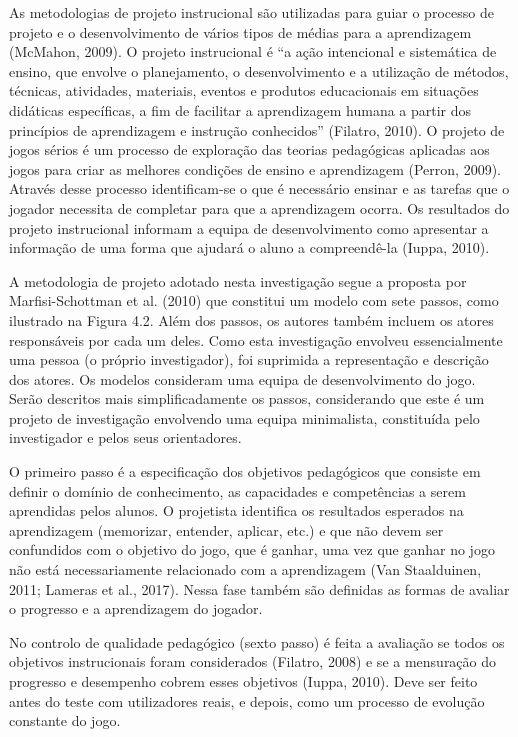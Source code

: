 As metodologias de projeto instrucional são utilizadas para guiar o processo de projeto e o desenvolvimento de vários tipos de médias para a aprendizagem (McMahon, 2009). O projeto instrucional é ``a ação intencional e sistemática de ensino, que envolve o planejamento, o desenvolvimento e a utilização de métodos, técnicas, atividades, materiais, eventos e produtos educacionais em situações didáticas específicas, a fim de facilitar a aprendizagem humana a partir dos princípios de aprendizagem e instrução conhecidos'' (Filatro, 2010). O projeto de jogos sérios é um processo de exploração das teorias pedagógicas aplicadas aos jogos para criar as melhores condições de ensino e aprendizagem (Perron, 2009). Através desse processo identificam-se o que é necessário ensinar e as tarefas que o jogador necessita de completar para que a aprendizagem ocorra. Os resultados do projeto instrucional informam a equipa de desenvolvimento como apresentar a informação de uma forma que ajudará o aluno a compreendê-la (Iuppa, 2010).

A metodologia de projeto adotado nesta investigação segue a proposta por Marfisi-Schottman et al. (2010) que constitui um modelo com sete passos, como ilustrado na Figura 4.2. Além dos passos, os autores também incluem os atores responsáveis por cada um deles. Como esta investigação envolveu essencialmente uma pessoa (o próprio investigador), foi suprimida a representação e descrição dos atores. Os modelos consideram uma equipa de desenvolvimento do jogo. Serão descritos mais simplificadamente os passos, considerando que este é um projeto de investigação envolvendo uma equipa minimalista, constituída pelo investigador e pelos seus orientadores.

O primeiro passo é a especificação dos objetivos pedagógicos que consiste em definir o domínio de conhecimento, as capacidades e competências a serem aprendidas pelos alunos. O projetista identifica os resultados esperados na aprendizagem (memorizar, entender, aplicar, etc.) e que não devem ser confundidos com o objetivo do jogo, que é ganhar, uma vez que ganhar no jogo não está necessariamente relacionado com a aprendizagem (Van Staalduinen, 2011; Lameras et al., 2017). Nessa fase também são definidas as formas de avaliar o progresso e a aprendizagem do jogador.

No controlo de qualidade pedagógico (sexto passo) é feita a avaliação se todos os objetivos instrucionais foram considerados (Filatro, 2008) e se a mensuração do progresso e desempenho cobrem esses objetivos (Iuppa, 2010). Deve ser feito antes do teste com utilizadores reais, e depois, como um processo de evolução constante do jogo.


